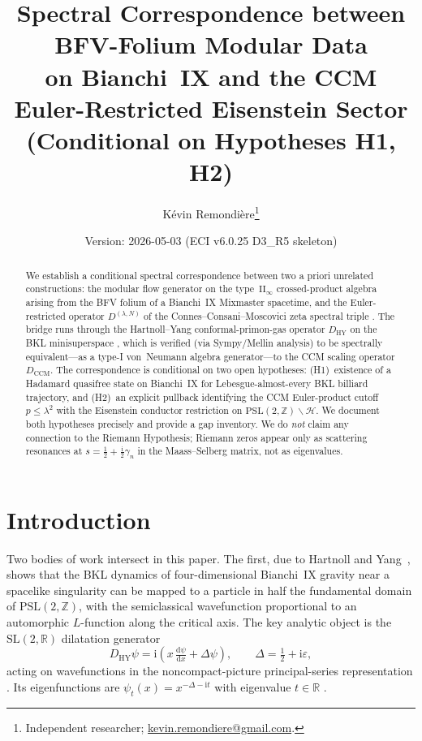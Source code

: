 \documentclass[11pt]{article}
\title{%
  Spectral Correspondence between BFV-Folium Modular Data\\
  on Bianchi~IX and the CCM Euler-Restricted Eisenstein Sector\\[6pt]
  {\large (Conditional on Hypotheses H1, H2)}}
\author{Kévin Remondière\thanks{Independent researcher; \href{mailto:kevin.remondiere@gmail.com}{kevin.remondiere@gmail.com}.}}
\date{Version: 2026-05-03 (ECI v6.0.25 D3\_R5 skeleton)}
\newcommand{\HY}{\mathrm{HY}}
\newcommand{\CCM}{\mathrm{CCM}}
\newcommand{\PSL}{\mathrm{PSL}}
\newcommand{\SL}{\mathrm{SL}}
\newcommand{\dd}{\mathrm{d}}
\newcommand{\ii}{\mathrm{i}}
\newcommand{\Lam}{\lambda}
\newcommand{\eps}{\varepsilon}
\newcommand{\Del}{\Delta}
\newcommand{\II}{\mathrm{II}_\infty}
\begin{document}
\maketitle

\begin{abstract}
We establish a conditional spectral correspondence between two a priori
unrelated constructions: the modular flow generator on the type~$\II$
crossed-product algebra arising from the BFV folium of a Bianchi~IX
Mixmaster spacetime, and the Euler-restricted operator $D^{(\Lam,N)}$
of the Connes--Consani--Moscovici zeta spectral triple
\cite{CCM2025}. The bridge runs through the Hartnoll--Yang
conformal-primon-gas operator $D_\HY$ on the BKL minisuperspace
\cite{HY2025}, which is verified (via Sympy/Mellin analysis) to be
spectrally equivalent---as a type-I von~Neumann algebra generator---to
the CCM scaling operator $D_\CCM$. The correspondence is conditional on
two open hypotheses: (H1)~existence of a Hadamard quasifree state on
Bianchi~IX for Lebesgue-almost-every BKL billiard trajectory, and
(H2)~an explicit pullback identifying the CCM Euler-product cutoff
$p \le \Lam^2$ with the Eisenstein conductor restriction on
$\PSL(2,\mathbb{Z})\backslash\mathcal{H}$. We document both hypotheses
precisely and provide a gap inventory. We do \emph{not} claim any
connection to the Riemann Hypothesis; Riemann zeros appear only as
scattering resonances at $s = \tfrac{1}{2} + \tfrac{\ii}{2}\gamma_n$
in the Maass--Selberg matrix, not as eigenvalues.
\end{abstract}

\section{Introduction}
\label{sec:intro}

Two bodies of work intersect in this paper. The first, due to Hartnoll
and Yang~\cite{HY2025}, shows that the BKL dynamics of four-dimensional
Bianchi~IX gravity near a spacelike singularity can be mapped to a
particle in half the fundamental domain of $\PSL(2,\mathbb{Z})$, with
the semiclassical wavefunction proportional to an automorphic
$L$-function along the critical axis. The key analytic object is the
$\SL(2,\mathbb{R})$ dilatation generator
\begin{equation}
  D_\HY \psi = \ii\!\left(x\,\tfrac{\dd\psi}{\dd x} + \Del\psi\right),
  \qquad \Del = \tfrac{1}{2} + \ii\eps,
  \label{eq:DHY-def}
\end{equation}
acting on wavefunctions in the noncompact-picture principal-series
representation \cite[eq.~(37)]{HY2025}. Its eigenfunctions are
$\psi_t(x) = x^{-\Del - \ii t}$ with eigenvalue $t \in \mathbb{R}$
\cite[eq.~(43)]{HY2025}.
\end{document}

